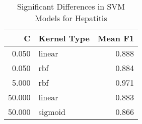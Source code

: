 \begin{table}
\centering
\caption{Significant Differences in SVM Models for Hepatitis}
\label{tab:svm_significant_pairs_hepatitis}
\begin{tabular}{rlr}
\toprule
C & Kernel Type & Mean F1 \\
\midrule
0.050 & linear & 0.888 \\
0.050 & rbf & 0.884 \\
5.000 & rbf & 0.971 \\
50.000 & linear & 0.883 \\
50.000 & sigmoid & 0.866 \\
\bottomrule
\end{tabular}
\end{table}
